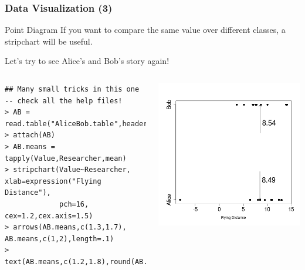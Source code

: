 \documentclass[10pt]{beamer}
\begin{document}
\begin{frame}
  \frametitle{Data Visualization (3)}
  \begin{block}{Point Diagram}
    If you want to compare the same value over different classes, a
    stripchart will be useful.
    \medskip

    Let's try to see Alice's and Bob's story again!
  \end{block}
  \begin{columns}[c]
\tiny{
\begin{verbatim}
## Many small tricks in this one -- check all the help files!
> AB = read.table("AliceBob.table",header=T)
> attach(AB)
> AB.means = tapply(Value,Researcher,mean)
> stripchart(Value~Researcher, xlab=expression("Flying Distance"), 
             pch=16, cex=1.2,cex.axis=1.5)
> arrows(AB.means,c(1.3,1.7), AB.means,c(1,2),length=.1)
> text(AB.means,c(1.2,1.8),round(AB.means,2),pos=4,cex=2)
\end{verbatim}}
    \includegraphics[width=1\textwidth]{img/point.png}
  \end{columns}
\end{frame}
\end{document}
